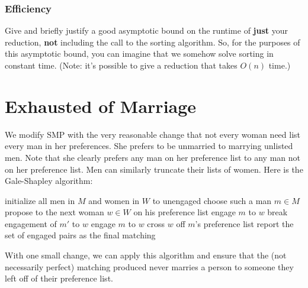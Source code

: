 \documentclass[11pt, oneside]{article}   	%
\theoremstyle{definition}
\theoremstyle{remark}
\begin{document}
\subsubsection{Efficiency}
Give and briefly justify a good asymptotic bound on the runtime
of \textbf{just} your reduction, \textbf{not} including the call to the sorting
algorithm. So, for the purposes of this asymptotic bound, you can
imagine that we somehow solve sorting in constant time. (Note: it's
possible to give a reduction that takes $O(n)$ time.)


\cleardoublepage
\section{Exhausted of Marriage}
We modify SMP with the very reasonable change that not every woman
need list every man in her preferences. She prefers to be unmarried to
marrying unlisted men. Note that she clearly prefers any man on her
preference list to any man not on her preference list. Men can
similarly truncate their lists of women.
Here is the Gale-Shapley algorithm:
  \begin{algorithmic}[1]
    \State initialize all men in $M$ and women in $W$ to unengaged
      \State choose such a man $m \in M$
      \State propose to the next woman $w \in W$ on his preference list
        \State engage $m$ to $w$
        \State break engagement of $m'$ to $w$
        \State engage $m$ to $w$
      \EndIf
      \State cross $w$ off $m$'s preference list
    \EndWhile
    \State report the set of engaged pairs as the final matching
  \EndProcedure
  \end{algorithmic}
With one small change, we can apply this algorithm and ensure that the
(not necessarily perfect) matching produced never marries a person to
someone they left off of their preference list.
\end{document}
